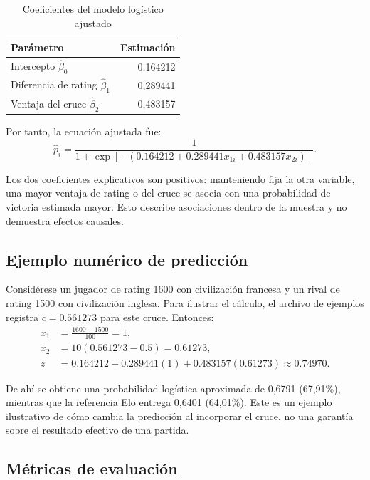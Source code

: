 \documentclass[12pt,a4paper]{article}
\begin{document}
\begin{table}[htbp]
\centering
\caption{Coeficientes del modelo logístico ajustado}
\label{tab:coef}
\begin{tabular}{lr}
\toprule
\textbf{Parámetro} & \textbf{Estimación}\\
\midrule
Intercepto $\hat\beta_0$ & 0,164212\\
Diferencia de rating $\hat\beta_1$ & 0,289441\\
Ventaja del cruce $\hat\beta_2$ & 0,483157\\
\bottomrule
\end{tabular}
\end{table}

Por tanto, la ecuación ajustada fue:
\begin{equation}
\boxed{\hat p_i=\frac{1}{1+\exp\!\left[-\left(0.164212+0.289441x_{1i}+0.483157x_{2i}\right)\right]}}.
\label{eq:logit_final}
\end{equation}

Los dos coeficientes explicativos son positivos: manteniendo fija la otra variable, una mayor ventaja de rating o del cruce se asocia con una probabilidad de victoria estimada mayor. Esto describe asociaciones dentro de la muestra y no demuestra efectos causales.

\subsection{Ejemplo numérico de predicción}

Considérese un jugador de rating 1600 con civilización francesa y un rival de rating 1500 con civilización inglesa. Para ilustrar el cálculo, el archivo de ejemplos registra $c=0.561273$ para este cruce. Entonces:
\begin{align}
x_1&=\frac{1600-1500}{100}=1,\\
x_2&=10(0.561273-0.5)=0.61273,\\
z&=0.164212+0.289441(1)+0.483157(0.61273)\approx 0.74970.
\end{align}

De ahí se obtiene una probabilidad logística aproximada de 0,6791 (67,91\%), mientras que la referencia Elo entrega 0,6401 (64,01\%). Este es un ejemplo ilustrativo de cómo cambia la predicción al incorporar el cruce, no una garantía sobre el resultado efectivo de una partida.

\subsection{Métricas de evaluación}
\end{document}

